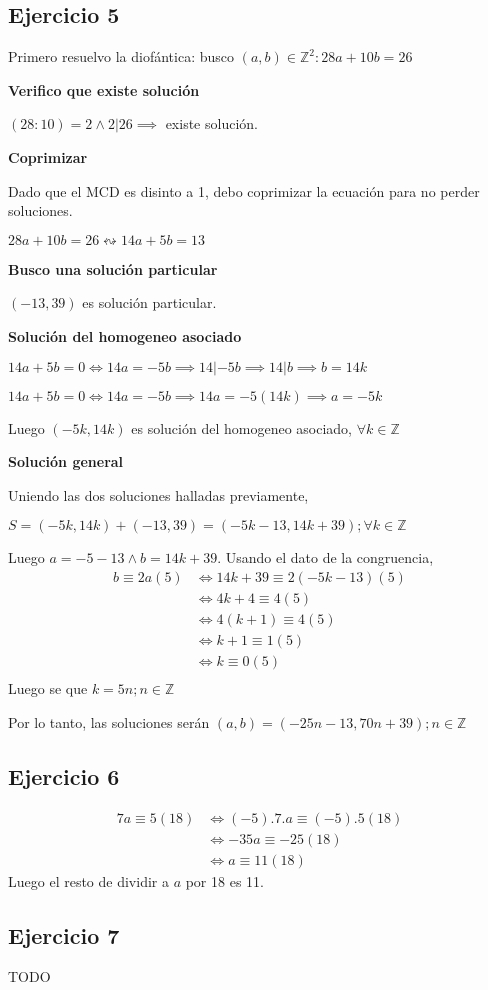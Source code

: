 \subsection{Ejercicio 5}

Primero resuelvo la diofántica: busco $ (a,b) \in \mathbb{Z}^2: 28a+10b = 26 $

\textbf{Verifico que existe solución}

$ (28:10) = 2 \wedge 2|26 \implies $ existe solución.

\textbf{Coprimizar}

Dado que el MCD es disinto a 1, debo coprimizar la ecuación para no perder soluciones.

$ 28a+10b =26 \leftrightsquigarrow 14a+5b=13$

\textbf{Busco una solución particular}

$ (-13,39) $ es solución particular.

\textbf{Solución del homogeneo asociado}

$ 14a+5b = 0 \iff 14a = -5b \implies 14|-5b \implies 14|b \implies b=14k $

$ 14a+5b = 0 \iff 14a = -5b \implies 14a = -5(14k) \implies a = -5k $

Luego $ (-5k, 14k) $ es solución del homogeneo asociado, $ \forall k \in \mathbb{Z} $

\textbf{Solución general}

Uniendo las dos soluciones halladas previamente,

$ S = (-5k, 14k) + (-13,39) = (-5k-13, 14k+39); \forall k \in \mathbb{Z} $

Luego $ a = -5-13 \wedge b= 14k+39 $. Usando el dato de la congruencia,
\begin{align*}
    b\equiv 2a(5) &\iff 14k+39 \equiv 2(-5k-13)(5) \\
    &\iff 4k+4 \equiv 4(5) \\
    &\iff 4(k+1) \equiv 4(5) \\
    &\iff k+1 \equiv 1(5) \\
    &\iff k \equiv 0(5) \\
\end{align*}
Luego se que $ k = 5n; n \in \mathbb{Z} $

Por lo tanto, las soluciones serán $ (a,b) = (-25n-13, 70n+39 ); n \in \mathbb{Z} $

\subsection{Ejercicio 6}

\begin{align*}
    7a \equiv 5(18) &\iff (-5).7.a \equiv (-5).5(18) \\  
    &\iff -35a \equiv -25(18) \\
    &\iff a \equiv 11(18)
\end{align*}
Luego el resto de dividir a $a$ por 18 es 11.

\subsection{Ejercicio 7}
TODO



